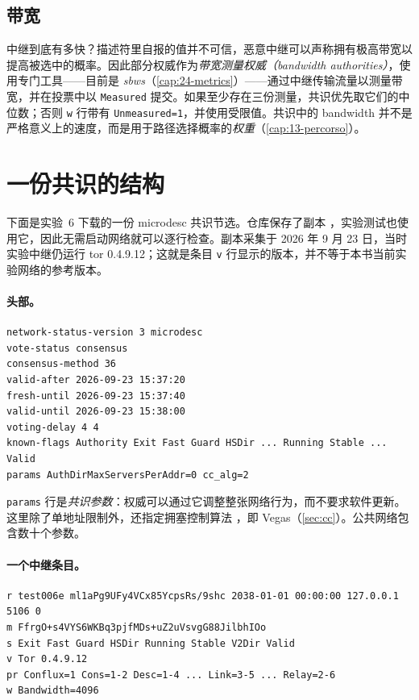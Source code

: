 \subsection{带宽}

中继到底有多快？描述符里自报的值并不可信，恶意中继可以声称拥有极高带宽以提高被选中的概率。因此部分权威作为\emph{带宽测量权威（bandwidth authorities）}，使用专门工具——目前是 \emph{sbws}（\cref{cap:24-metrics}）——通过中继传输流量以测量带宽，并在投票中以 \texttt{Measured} 提交。如果至少存在三份测量，共识优先取它们的中位数；否则 \texttt{w} 行带有 \texttt{Unmeasured=1}，并使用受限值。共识中的 bandwidth 并不是严格意义上的速度，而是用于路径选择概率的\emph{权重}（\cref{cap:13-percorso}）。

\section{一份共识的结构}\label{sec:dir-anatomia}

下面是实验~6 下载的一份 microdesc 共识节选。仓库保存了副本 ，实验测试也使用它，因此无需启动网络就可以逐行检查。副本采集于 2026 年 9 月 23 日，当时实验中继仍运行 tor 0.4.9.12；这就是条目 \texttt{v} 行显示的版本，并不等于本书当前实验网络的参考版本。

\paragraph{头部。}
\begin{lstlisting}[numbers=none]
network-status-version 3 microdesc
vote-status consensus
consensus-method 36
valid-after 2026-09-23 15:37:20
fresh-until 2026-09-23 15:37:40
valid-until 2026-09-23 15:38:00
voting-delay 4 4
known-flags Authority Exit Fast Guard HSDir ... Running Stable ... Valid
params AuthDirMaxServersPerAddr=0 cc_alg=2
\end{lstlisting}

\texttt{params} 行是\emph{共识参数}：权威可以通过它调整整张网络行为，而不要求软件更新。这里除了单地址限制外，还指定拥塞控制算法 ，即 Vegas（\cref{sec:cc}）。公共网络包含数十个参数。

\paragraph{一个中继条目。}
\begin{lstlisting}[numbers=none]
r test006e ml1aPg9UFy4VCx85YcpsRs/9shc 2038-01-01 00:00:00 127.0.0.1 5106 0
m FfrgO+s4VYS6WKBq3pjfMDs+uZ2uVsvgG88JilbhIOo
s Exit Fast Guard HSDir Running Stable V2Dir Valid
v Tor 0.4.9.12
pr Conflux=1 Cons=1-2 Desc=1-4 ... Link=3-5 ... Relay=2-6
w Bandwidth=4096
\end{lstlisting}

